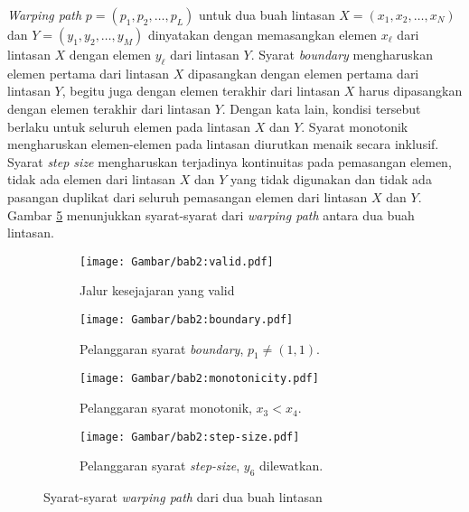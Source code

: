 \documentclass[a4paper,twoside]{article}
\begin{document}
\textit{Warping path} $p = (p_1, p_2, \ldots, p_L)$ untuk dua buah lintasan $X = (x_1, x_2, \ldots, x_N)$ dan $Y = (y_1, y_2, \ldots, y_M)$ dinyatakan dengan memasangkan elemen $x_\ell$ dari lintasan $X$ dengan elemen $y_\ell$ dari lintasan $Y$. Syarat \textit{boundary} mengharuskan elemen pertama dari lintasan $X$ dipasangkan dengan elemen pertama dari lintasan $Y$, begitu juga dengan elemen terakhir dari lintasan $X$ harus dipasangkan dengan elemen terakhir dari lintasan $Y$. Dengan kata lain, kondisi tersebut berlaku untuk seluruh elemen pada lintasan $X$ dan $Y$. Syarat monotonik mengharuskan elemen-elemen pada lintasan diurutkan menaik secara inklusif. Syarat \textit{step size} mengharuskan terjadinya kontinuitas pada pemasangan elemen, tidak ada elemen dari lintasan $X$ dan $Y$ yang tidak digunakan dan tidak ada pasangan duplikat dari seluruh pemasangan elemen dari lintasan $X$ dan $Y$. Gambar \ref{bab2:dtw-requirements} menunjukkan syarat-syarat dari \textit{warping path} antara dua buah lintasan.

\begin{figure}[b]
    \centering
    \begin{subfigure}[h]{0.225\textwidth}
        \centering
        \texttt{[image: Gambar/bab2:valid.pdf]}
        \caption{Jalur kesejajaran yang valid}
        \label{bab2:valid}
    \end{subfigure}
    \begin{subfigure}[h]{0.225\textwidth}
        \centering
        \texttt{[image: Gambar/bab2:boundary.pdf]}
        \caption{Pelanggaran syarat \textit{boundary}, $p_1 \neq (1, 1)$.}
        \label{bab2:boundary}
    \end{subfigure}
    \begin{subfigure}[h]{0.225\textwidth}
        \centering
        \texttt{[image: Gambar/bab2:monotonicity.pdf]}
        \caption{Pelanggaran syarat monotonik, $x_3 < x_4$.}
        \label{bab2:monotonicity}
    \end{subfigure}
    \begin{subfigure}[h]{0.225\textwidth}
        \centering
        \texttt{[image: Gambar/bab2:step-size.pdf]}
        \caption{Pelanggaran syarat \textit{step-size}, $y_6$ dilewatkan.}
        \label{bab2:step-size}
    \end{subfigure}
    \caption[Syarat-syarat \textit{warping path}]{Syarat-syarat \textit{warping path} dari dua buah lintasan}
    \label{bab2:dtw-requirements}
\end{figure}
\end{document}
